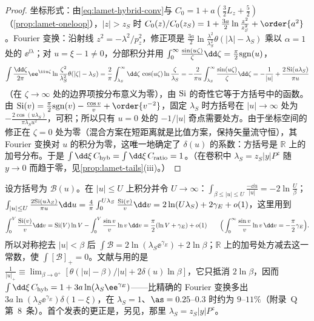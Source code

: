 \begin{proof}
坐标形式：由\cref{eq:lamet-hybrid-conv}与 $C_0=1+a(\frac32L_z+\frac52)$（\cref{prop:lamet-oneloop}），$|z|>z_S$ 时 $C_0(z)/C_0(z_S)=1+\frac{3a}2\ln\frac{z^2}{z_S^2}+\order{a^2}$。Fourier 变换：沿射线 $z^2=-\lambda^2/p_z^2$，修正项是 $\frac{3a}2\ln\frac{\lambda^2}{\lambda_S^2}\theta(|\lambda|-\lambda_S)$ 乘以 $\alpha=1$ 处的 $\ee^{\ii\lambda}$；对 $u=\xi-1\neq0$，分部积分并用 $\int_0^\infty\frac{\sin(u\zeta)}\zeta\dd\zeta=\frac\pi2{\rm sgn}(u)$，
\[
\int\frac{\dd\zeta}{2\pi}\ee^{\ii u\zeta}\ln\frac{\zeta^2}{\lambda_S^2}\theta(|\zeta|-\lambda_S)=\frac2\pi\int_{\lambda_S}^\infty\dd\zeta\,\cos(u\zeta)\ln\frac\zeta{\lambda_S}=-\frac2{\pi u}\int_{\lambda_S}^\infty\frac{\sin(u\zeta)}\zeta\dd\zeta=-\frac1{|u|}+\frac{2\,{\rm Si}(u\lambda_S)}{\pi u}
\]
（在 $\zeta\to\infty$ 处的边界项按分布意义为零），由 ${\rm Si}$ 的奇性它等于方括号中的函数。由 ${\rm Si}(v)=\frac\pi2{\rm sgn}(v)-\frac{\cos v}v+\order{v^{-2}}$，固定 $\lambda_S$ 时方括号在 $|u|\to\infty$ 处为 $-\frac{2\cos(u\lambda_S)}{\pi\lambda_Su^2}$，可积；所以只有 $u=0$ 处的 $-1/|u|$ 奇点需要处方。由于坐标空间的修正在 $\zeta=0$ 处为零（混合方案在短距离就是比值方案，保持矢量流守恒），其 Fourier 变换对 $u$ 的积分为零，这唯一地确定了 $\delta(u)$ 的系数：方括号是 $\mathbb R$ 上的加号分布。于是 $\int\dd\xi\,C_{\rm hyb}=\int\dd\xi\,C_{\rm ratio}=1$。（在卷积中 $\lambda_S=z_S|y|P^z$ 随 $y\to0$ 而趋于零，见\cref{prop:lamet-tails}(iii)。）
\end{proof}

\begin{example}[混合核的归一化]\label{ex:lamet-hybrid-normalization}
设方括号为 $\mathcal B(u)$。在 $|u|\le U$ 上积分并令 $U\to\infty$：$\int_{\beta\le|u|\le U}\frac{-\dd u}{|u|}=-2\ln\frac U\beta$；$\int_{|u|\le U}\frac{2{\rm Si}(u\lambda_S)}{\pi u}\dd u=\frac4\pi\int_0^{U\lambda_S}\frac{{\rm Si}(v)}v\dd v=2\ln(U\lambda_S)+2\gamma_E+o(1)$，这里用到
\[
\int_0^V\frac{{\rm Si}(v)}v\dd v={\rm Si}(V)\ln V-\int_0^V\frac{\sin v}v\ln v\,\dd v=\frac\pi2(\ln V+\gamma_E)+o(1)\qquad\Big(\int_0^\infty\frac{\sin v}v\ln v\,\dd v=-\frac\pi2\gamma_E\Big).
\]
所以对称挖去 $|u|<\beta$ 后 $\int\mathcal B=2\ln(\lambda_S\ee^{\gamma_E})+2\ln\beta$；$\mathbb R$ 上的加号处方减去这一常数，使 $\int[\mathcal B]_+=0$。文献\cite[式~(33)--(34)]{Ji:2020brr}与\cite[式~(120)--(121)]{JiEtAl2021}用的是 $\frac1{|u|_+}\equiv\lim_{\beta\to0^+}[\theta(|u|-\beta)/|u|+2\delta(u)\ln\beta]$，它只抵消 $2\ln\beta$，因而 $\int\dd\xi\,C_{\rm hyb}=1+3a\ln(\lambda_S\ee^{\gamma_E})$——比精确的 Fourier 变换多出 $3a\ln(\lambda_S\ee^{\gamma_E})\delta(1-\xi)$，在 $\lambda_S=1$、$\as=0.25$–$0.3$ 时约为 $9$–$11\%$（附录~Q 第~8~条）。首个发表的更正是\cite[式~(35)]{Chou:2022drv}，另见\cite[式~(A.14)]{Su:2022fiu}，那里 $\lambda_S=z_S|y|P^z$。
\end{example}

